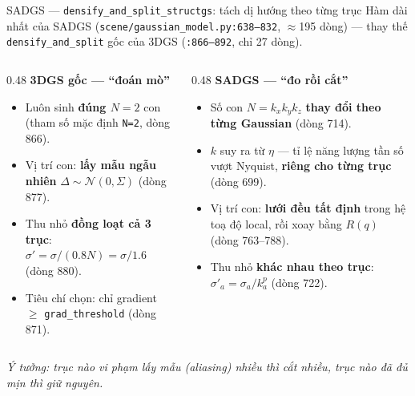 
\begin{frame}{SADGS --- \texttt{densify\_and\_split\_structgs}: tách dị hướng theo từng trục}
\footnotesize
Hàm dài nhất của SADGS (\texttt{scene/gaussian\_model.py:638--832}, $\approx$195 dòng) --- thay thế
\texttt{densify\_and\_split} gốc của 3DGS (\texttt{:866--892}, chỉ 27 dòng).
\vspace{0.2cm}
\begin{columns}[T]
\begin{column}{0.48\linewidth}
\textbf{3DGS gốc --- ``đoán mò''}
\begin{itemize}
  \item Luôn sinh \textbf{đúng $N=2$} con (tham số mặc định \texttt{N=2}, dòng 866).
  \item Vị trí con: \textbf{lấy mẫu ngẫu nhiên} $\Delta\sim\mathcal{N}(0,\Sigma)$ (dòng 877).
  \item Thu nhỏ \textbf{đồng loạt cả 3 trục}: $\sigma'=\sigma/(0.8N)=\sigma/1.6$ (dòng 880).
  \item Tiêu chí chọn: chỉ gradient $\ge$ \texttt{grad\_threshold} (dòng 871).
\end{itemize}
\end{column}
\begin{column}{0.48\linewidth}
\textbf{SADGS --- ``đo rồi cắt''}
\begin{itemize}
  \item Số con $N=k_xk_yk_z$ \textbf{thay đổi theo từng Gaussian} (dòng 714).
  \item $k$ suy ra từ $\eta$ --- tỉ lệ năng lượng tần số vượt Nyquist, \textbf{riêng cho từng trục} (dòng 699).
  \item Vị trí con: \textbf{lưới đều tất định} trong hệ toạ độ local, rồi xoay bằng $R(q)$ (dòng 763--788).
  \item Thu nhỏ \textbf{khác nhau theo trục}: $\sigma'_a=\sigma_a/k_a^{p}$ (dòng 722).
\end{itemize}
\end{column}
\end{columns}
\vspace{0.25cm}
\centering
\emph{Ý tưởng: trục nào vi phạm lấy mẫu (aliasing) nhiều thì cắt nhiều, trục nào đã đủ mịn thì giữ nguyên.}
\end{frame}



